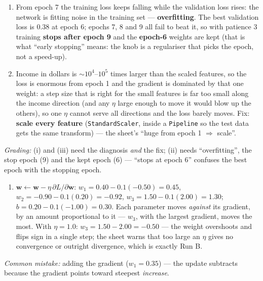 \documentclass[
  11pt,
]{article}
\providecommand{\tightlist}{%
  \setlength{\itemsep}{0pt}\setlength{\parskip}{0pt}}
\begin{document}
\begin{solutionbox}
\begin{enumerate}
\def\labelenumi{(\roman{enumi})}
\setcounter{enumi}{1}
\tightlist
\item
  From epoch 7 the training loss keeps falling while the validation loss
  rises: the network is fitting noise in the training set ---
  \textbf{overfitting}. The best validation loss is \(0.38\) at epoch 6;
  epochs 7, 8 and 9 all fail to beat it, so with patience 3 training
  \textbf{stops after epoch 9} and the \textbf{epoch-6} weights are kept
  (that is what ``early stopping'' means: the knob is a regulariser that
  picks the epoch, not a speed-up).
\item
  Income in dollars is \(\sim10^4\)--\(10^5\) times larger than the
  scaled features, so the loss is enormous from epoch 1 and the gradient
  is dominated by that one weight: a step size that is right for the
  small features is far too small along the income direction (and any
  \(\eta\) large enough to move it would blow up the others), so one
  \(\eta\) cannot serve all directions and the loss barely moves. Fix:
  \textbf{scale every feature} (\texttt{StandardScaler}, inside a
  \texttt{Pipeline} so the test data gets the same transform) --- the
  sheet's ``huge from epoch 1 \(\Rightarrow\) scale''.
\end{enumerate}

\emph{Grading:} (i) and (iii) need the diagnosis \emph{and} the fix;
(ii) needs ``overfitting'', the stop epoch (9) and the kept epoch (6)
--- ``stops at epoch 6'' confuses the best epoch with the stopping
epoch.

\begin{enumerate}
\def\labelenumi{(\alph{enumi})}
\setcounter{enumi}{2}
\tightlist
\item
  \(\mathbf w \leftarrow \mathbf w - \eta\,\partial L/\partial\mathbf w\):
  \(w_1 = 0.40 - 0.1(-0.50) = \mathbf{0.45}\),
  \(w_2 = -0.90 - 0.1(0.20) = \mathbf{-0.92}\),
  \(w_3 = 1.50 - 0.1(2.00) = \mathbf{1.30}\);
  \(b = 0.20 - 0.1(-1.00) = \mathbf{0.30}\). Each parameter moves
  \emph{against} its gradient, by an amount proportional to it ---
  \(w_3\), with the largest gradient, moves the most. With
  \(\eta = 1.0\): \(w_3 = 1.50 - 2.00 = \mathbf{-0.50}\) --- the weight
  overshoots and flips sign in a single step; the sheet warns that too
  large an \(\eta\) gives no convergence or outright divergence, which
  is exactly Run B.
\end{enumerate}

\emph{Common mistake:} adding the gradient (\(w_1 = 0.35\)) --- the
update subtracts because the gradient points toward steepest
\emph{increase}.

\end{solutionbox}
\end{document}
